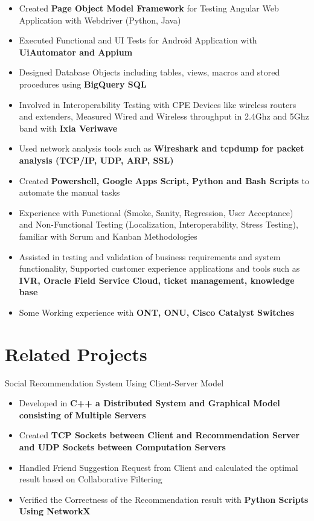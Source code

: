 \documentclass{resume}
\begin{document}
\begin{itemize}[parsep=0.10ex]
\item Created \textbf{Page Object Model Framework} for Testing Angular Web Application with Webdriver (Python, Java)
\item Executed Functional and UI Tests for Android Application with \textbf{UiAutomator and Appium}
\item Designed Database Objects including tables, views, macros and stored procedures using \textbf{BigQuery SQL}
\item Involved in Interoperability Testing with CPE Devices like wireless routers and extenders, Measured Wired and Wireless
throughput in 2.4Ghz and 5Ghz band with \textbf{Ixia Veriwave}
\item Used network analysis tools such as \textbf{Wireshark and tcpdump for packet analysis (TCP/IP, UDP, ARP, SSL)}
\item Created \textbf{Powershell, Google Apps Script, Python and Bash Scripts} to automate the manual tasks
\item Experience with Functional (Smoke, Sanity, Regression, User Acceptance) and Non-Functional Testing (Localization,
Interoperability, Stress Testing), familiar with Scrum and Kanban Methodologies
\item Assisted in testing and validation of business requirements and system functionality, Supported customer experience applications
and tools such as \textbf{IVR, Oracle Field Service Cloud, ticket management, knowledge base}
\item Some Working experience with \textbf{ONT, ONU, Cisco Catalyst Switches}
\end{itemize}

\section{Related Projects}


Social Recommendation System Using Client-Server Model
\begin{itemize}[parsep=0.10ex]
    \item Developed in \textbf{C++ a Distributed System and Graphical Model consisting of Multiple Servers}
    \item Created \textbf{TCP Sockets between Client and Recommendation Server and UDP Sockets between Computation Servers}
    \item Handled Friend Suggestion Request from Client and calculated the optimal result based on Collaborative Filtering
    \item Verified the Correctness of the Recommendation result with \textbf{Python Scripts Using NetworkX}
\end{itemize}
\end{document}
